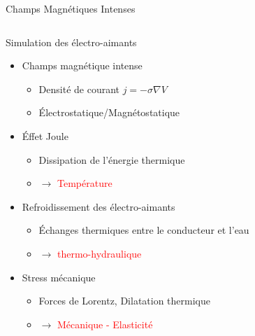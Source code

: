 \begin{frame}{Champs Magnétiques Intenses}
  \vspace*{-0.5cm}
  \begin{columns}[c]
    \begin{column}{.5\linewidth}

      \begin{block}{Simulation des électro-aimants}
        \begin{itemize}
        \item Champs magnétique intense
          \begin{itemize}
          \item Densité de courant $j=-\sigma \nabla V$
          \item Électrostatique/Magnétostatique
          \end{itemize}

        \item Éffet Joule
          \begin{itemize}
          \item Dissipation de l'énergie thermique
          \item $\rightarrow$ \textcolor{red}{Température} \\
          \end{itemize}

        \item Refroidissement des électro-aimants
          \begin{itemize}
          \item Échanges thermiques entre le conducteur et l'eau
          \item $\rightarrow$ \textcolor{red}{thermo-hydraulique } \\
          \end{itemize}

        \item Stress mécanique
          \begin{itemize}
          \item Forces de Lorentz, Dilatation thermique
          \item $\rightarrow$ \textcolor{red}{Mécanique - Elasticité} \\
          \end{itemize}
        \end{itemize}
      \end{block}


\end{column}
\end{columns}
\end{frame}
